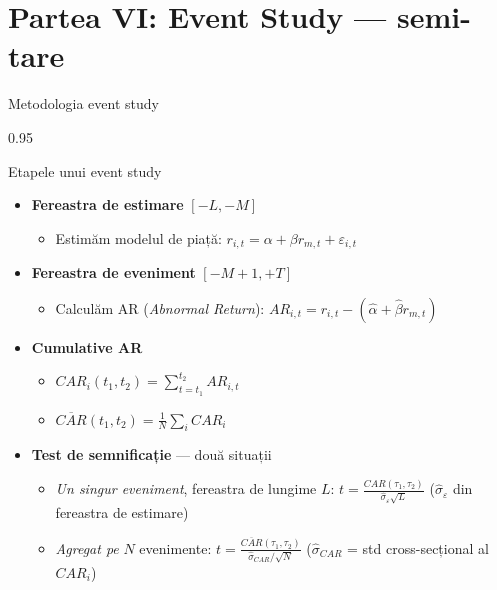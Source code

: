 \documentclass[9pt, aspectratio=169, t]{beamer}
\begin{document}
\section{Partea VI: Event Study --- semi-tare}

\begin{frame}[shrink=15]{Metodologia event study}
\begin{cminipage}{0.95\textwidth}
\begin{block}{Etapele unui event study}
\begin{itemize}\setlength{\itemsep}{0pt}
    \item \textbf{Fereastra de estimare} $[-L, -M]$
    \begin{itemize}\setlength{\itemsep}{0pt}
        \item Estimăm modelul de piață: $r_{i,t} = \alpha + \beta r_{m,t} + \varepsilon_{i,t}$
    \end{itemize}
    \item \textbf{Fereastra de eveniment} $[-M+1, +T]$
    \begin{itemize}\setlength{\itemsep}{0pt}
        \item Calculăm AR (\textit{Abnormal Return}): $AR_{i,t} = r_{i,t} - (\hat\alpha + \hat\beta r_{m,t})$
    \end{itemize}
    \item \textbf{Cumulative AR}
    \begin{itemize}\setlength{\itemsep}{0pt}
        \item $CAR_i(t_1, t_2) = \sum_{t=t_1}^{t_2} AR_{i,t}$
        \item $\overline{CAR}(t_1, t_2) = \frac{1}{N}\sum_i CAR_i$
    \end{itemize}
    \item \textbf{Test de semnificație} --- două situații
    \begin{itemize}\setlength{\itemsep}{0pt}
        \item \emph{Un singur eveniment}, fereastra de lungime $L$:
        \;$\displaystyle t = \frac{CAR(\tau_1, \tau_2)}{\hat\sigma_\varepsilon \sqrt{L}}$
        \;\;($\hat\sigma_\varepsilon$ din fereastra de estimare)
        \item \emph{Agregat pe} $N$ evenimente:
        \;$\displaystyle t = \frac{\overline{CAR}(\tau_1, \tau_2)}{\hat\sigma_{CAR} / \sqrt{N}}$
        \;\;($\hat\sigma_{CAR}$ = std cross-secțional al $CAR_i$)
    \end{itemize}
\end{itemize}
\end{block}
\end{cminipage}
\end{frame}
\end{document}
